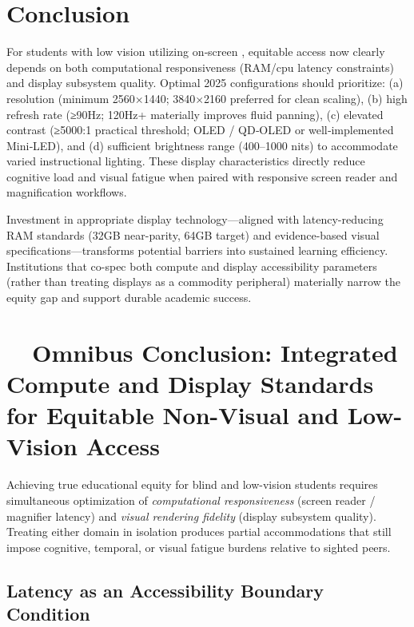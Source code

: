 \section{Conclusion}

For students with low vision utilizing on‑screen , equitable access now clearly depends on both computational responsiveness (RAM/\gls{cpu} latency constraints) and display subsystem quality. Optimal 2025 configurations should prioritize: (a) resolution (minimum 2560×1440; 3840×2160 preferred for clean scaling), (b) high refresh rate (≥90Hz; 120Hz+ materially improves fluid panning), (c) elevated contrast (≥5000:1 practical threshold; OLED / QD‑OLED or well‑implemented Mini‑LED), and (d) sufficient brightness range (400–1000 nits) to accommodate varied instructional lighting. These display characteristics directly reduce cognitive load and visual fatigue when paired with responsive screen reader and magnification workflows.

Investment in appropriate display technology—aligned with latency-reducing RAM standards (32GB near-parity, 64GB target) and evidence-based visual specifications—transforms potential barriers into sustained learning efficiency. Institutions that co-spec both compute and display accessibility parameters (rather than treating displays as a commodity peripheral) materially narrow the equity gap and support durable academic success.

\section{~~Omnibus Conclusion: Integrated Compute and Display Standards for Equitable Non-Visual and Low-Vision Access}\label{chapter1-omnibus-conclusion}

Achieving true educational equity for blind and low-vision students requires simultaneous optimization of \emph{computational responsiveness} (screen reader / magnifier latency) and \emph{visual rendering fidelity} (display subsystem quality). Treating either domain in isolation produces partial accommodations that still impose cognitive, temporal, or visual fatigue burdens relative to sighted peers.

\subsection*{Latency as an Accessibility Boundary Condition}

